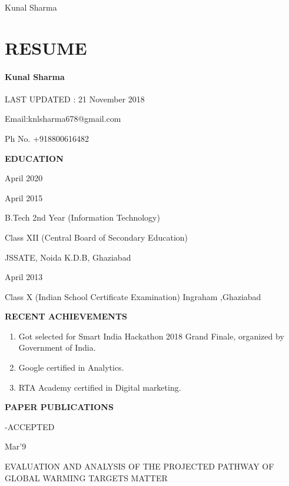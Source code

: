 \documentclass{article} %
\begin{document}


\noindent Kunal Sharma

\noindent 
\section{RESUME}

\noindent 
\paragraph{Kunal Sharma}

\noindent LAST UPDATED : 21 November 2018

\noindent 

\noindent Email:knlsharma678@gmail.com

\noindent Ph No. +918800616482

\noindent 

\noindent 

\noindent \textbf{EDUCATION \underbar{  }}

\noindent April 2020

\noindent April 2015

\noindent B.Tech 2nd Year (Information Technology)

\noindent Class XII (Central Board of Secondary Education)

\noindent JSSATE, Noida K.D.B, Ghaziabad

\noindent April 2013

\noindent Class X (Indian School Certificate Examination) Ingraham ,Ghaziabad

\noindent \textbf{RECENT ACHIEVEMENTS \underbar{  }}

\begin{enumerate}
\item  Got selected for Smart India Hackathon 2018 Grand Finale, organized by Government of India.

\item  Google certified in Analytics.

\item  RTA Academy certified in Digital marketing.
\end{enumerate}

 \textbf{PAPER PUBLICATIONS}

\noindent -ACCEPTED

\noindent Mar'9

\noindent EVALUATION AND ANALYSIS OF THE PROJECTED PATHWAY OF GLOBAL WARMING TARGETS MATTER
\end{document}
